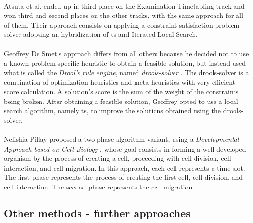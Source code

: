 \\
Atsuta et al. ended up in third place on the Examination Timetabling track and won third and second places on the other tracks, with the same approach for all of them. Their approach \cite{Atsuta2007} consists on applying a constraint satisfaction problem solver adopting an hybridization of \gls{ts} and Iterated Local Search.\\
\\
Geoffrey De Smet's approach \cite{Smet2007} differs from all others because he decided not to use a known problem-specific heuristic to obtain a feasible solution, but instead used what is called the \textit{Drool's rule engine}, named \textit{drools-solver} \cite{Drools}. The drools-solver is a combination of optimization heuristics and meta-heuristics with very efficient score calculation. A solution's score is the sum of the weight of the constraints being broken. After obtaining a feasible solution, Geoffrey opted to use a local search algorithm, namely \gls{ts}, to improve the solutions obtained using the drools-solver.\\
\\
Nelishia Pillay proposed a two-phase algorithm variant, using a \textit{Developmental Approach based on Cell Biology} \cite{Pillay2007}, whose goal consists in forming a well-developed organism by the process of creating a cell, proceeding with cell division, cell interaction, and cell migration. In this approach, each cell represents a time slot. The first phase represents the process of creating the first cell, cell division, and cell interaction. The second phase represents the cell migration.

\subsection{Other methods - further approaches}
\label{subsec:OtherAppr}

